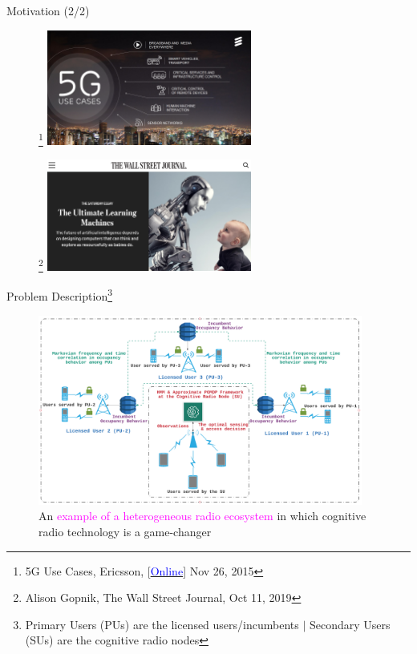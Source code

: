 \documentclass{beamer}
\begin{document}
\begin{frame}{Motivation (2/2)}
\begin{figure}
    \centering
    \footnote{\tiny{5G Use Cases, Ericsson, [\href{https://www.ericsson.com/assets/local/news/2015/7/5g-use-cases.pdf}{\textcolor{blue}{Online}}] Nov 26, 2015}}
    \includegraphics[width = 0.6\textwidth]{figs/Ericsson.PNG}
    \label{fig:1d}
\end{figure}
\begin{figure}
    \centering
    \footnote{\tiny{Alison Gopnik, The Wall Street Journal, Oct 11, 2019}}
    \includegraphics[width = 0.6\textwidth]{figs/WSJ_4.PNG}
    \label{fig:1e}
\end{figure}
\end{frame}
\begin{frame}{Problem Description\footnote{\tiny{Primary Users (PUs) are the licensed users/incumbents $|$ Secondary Users (SUs) are the cognitive radio nodes}}}
\begin{figure}
    \centering
    \includegraphics[width = 0.95\textwidth]{figs/System_Model_1.png}
    \caption{An \textcolor{magenta}{example of a heterogeneous radio ecosystem} in which cognitive radio technology is a game-changer}
    \label{fig:1f}
\end{figure}
\end{frame}
\end{document}
